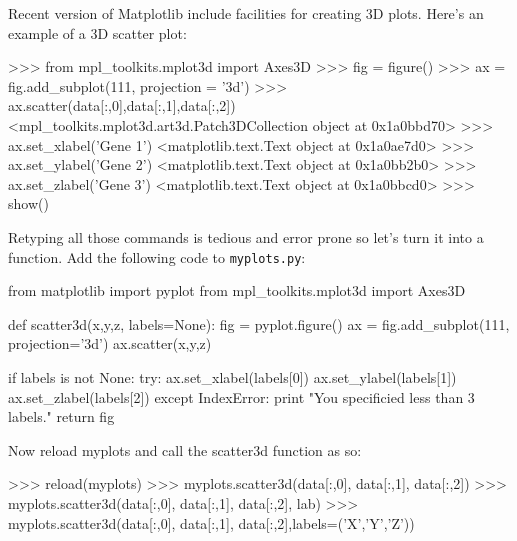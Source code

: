 Recent version of Matplotlib include facilities for creating 3D plots.
Here's an example of a 3D scatter plot:

\begin{python}
>>> from mpl_toolkits.mplot3d import Axes3D
>>> fig = figure()
>>> ax = fig.add_subplot(111, projection = '3d')
>>> ax.scatter(data[:,0],data[:,1],data[:,2])
<mpl_toolkits.mplot3d.art3d.Patch3DCollection object at 0x1a0bbd70>
>>> ax.set_xlabel('Gene 1')
<matplotlib.text.Text object at 0x1a0ae7d0>
>>> ax.set_ylabel('Gene 2')
<matplotlib.text.Text object at 0x1a0bb2b0>
>>> ax.set_zlabel('Gene 3')
<matplotlib.text.Text object at 0x1a0bbcd0>
>>> show()
\end{python}
%
Retyping all those commands is tedious and error prone so let's turn it
into a function. Add the following code to \lstinline!myplots.py!:

\begin{python}
from matplotlib import pyplot
from mpl_toolkits.mplot3d import Axes3D

def scatter3d(x,y,z, labels=None):
    fig = pyplot.figure()
    ax = fig.add_subplot(111, projection='3d')
    ax.scatter(x,y,z)

    if labels is not None:
        try:
            ax.set_xlabel(labels[0])
            ax.set_ylabel(labels[1])
            ax.set_zlabel(labels[2])
        except IndexError:
            print "You specificied less than 3 labels."
    return fig
\end{python}
Now reload myplots and call the scatter3d function as so:

\begin{python}
>>> reload(myplots)
>>> myplots.scatter3d(data[:,0], data[:,1], data[:,2])
>>> myplots.scatter3d(data[:,0], data[:,1], data[:,2], lab)
>>> myplots.scatter3d(data[:,0], data[:,1], data[:,2],labels=('X','Y','Z'))
\end{python}



